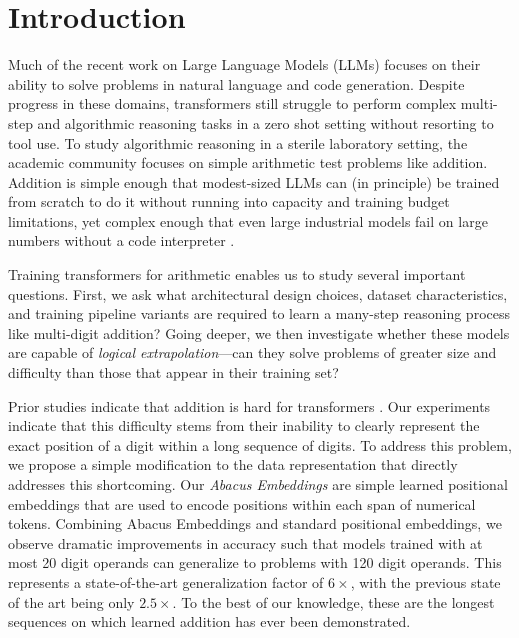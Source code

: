 \documentclass{article}
\begin{document}
\section{Introduction} 
\label{sec:intro}

Much of the recent work on  Large Language Models (LLMs) focuses on their ability to solve problems in natural language and code generation. 
Despite progress in these domains, transformers still struggle to perform complex multi-step and algorithmic reasoning tasks in a zero shot setting without resorting to tool use. 
To study algorithmic reasoning in a sterile laboratory setting, the academic community focuses on simple arithmetic test problems like addition.  
Addition is simple enough that modest-sized LLMs can (in principle) be trained from scratch to do it without running into capacity and training budget limitations, yet complex enough that even large industrial models fail on large numbers without a code interpreter \citep{loeber_16_2024}.

Training transformers for arithmetic enables us to study several important questions.  First, we ask what architectural design choices, dataset characteristics, and training pipeline variants are required to learn a many-step reasoning process like multi-digit addition? 
Going deeper, we then investigate whether these models are capable of {\em logical extrapolation}---can they solve problems of greater size and difficulty than those that appear in their training set? 

Prior studies indicate that addition is hard for transformers \citep{lee2023teaching, shen2023positional, zhou2023algorithms, zhou2024transformers}. 
Our experiments indicate that this difficulty stems from their inability to clearly represent the exact position of a digit within a long sequence of digits.  To address this problem, we propose a simple modification to the data representation that directly addresses this shortcoming. 
Our \textit{Abacus Embeddings} are simple learned positional embeddings that are used to encode positions within each span of numerical tokens. 
Combining Abacus Embeddings and standard positional embeddings, we observe dramatic improvements in accuracy such that models trained with at most 20 digit operands can generalize to problems with 120 digit operands. This represents a state-of-the-art generalization factor of \(6\times\), with the previous state of the art being only \(2.5\times\). 
To the best of our knowledge, these are the longest sequences on which learned addition has ever been demonstrated.
\end{document}
